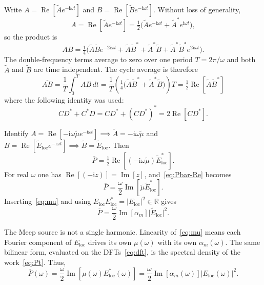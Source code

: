\documentclass[11pt,a4paper]{article}
\newcommand{\Eloc}{E_{\mathrm{loc}}}
\newcommand{\om}{\omega}
\newcommand{\alpm}{\alpha_m}
\newcommand{\re}[1]{\operatorname{Re}[#1]}
\newcommand{\im}[1]{\operatorname{Im}[#1]}
\begin{document}
\noindent
Write $A=\re{\tilde Ae^{-\mathrm{i}\om t}}$ and $B=\re{\tilde Be^{-\mathrm{i}\om t}}$.
Without loss of generality,
\begin{equation}
  A = \re{\tilde Ae^{-\mathrm{i}\om t}}
  =
  \tfrac12\bigl(\tilde Ae^{-\mathrm{i}\om t}+\tilde A^{\ast}e^{\mathrm{i}\om t}\bigr),
\end{equation}
so the product is
\begin{equation}
  AB
  =
  \tfrac14\bigl(
    \tilde A\tilde Be^{-2\mathrm{i}\om t}
    +\tilde A\tilde B^{\ast}
    +\tilde A^{\ast}\tilde B
    +\tilde A^{\ast}\tilde B^{\ast}e^{2\mathrm{i}\om t}
  \bigr).
  \label{eq:ABprod}
\end{equation}
The double-frequency terms average to zero over one period $T=2\pi/\om$ and both $\tilde A$ and $\tilde B$ are time independent.
The cycle average is therefore
\begin{equation}
  \overline{AB}
  =
  \frac{1}{T}\int_{0}^{T} AB\,dt
  =
  \frac{1}{T} \left( \tfrac14\bigl(\tilde A\tilde B^{\ast}+\tilde A^{\ast}\tilde B\bigr) \right) T
  =
  \tfrac12\re{\tilde A\tilde B^{\ast}}
  \label{eq:ABavg}
\end{equation}
where the following identity was used:
\begin{equation}
  CD^* + C^* D
  =
  CD^* + (CD^*)^* = 2 \operatorname{Re}[CD^*].
\end{equation}

\noindent
Identify $A=\re{-\mathrm{i}\om\tilde\mu e^{-\mathrm{i}\om t}} \implies \tilde A=-\mathrm{i}\om\tilde\mu$ and $B=\re{\tilde E_{\mathrm{loc}} e^{-\mathrm{i}\om t}} \implies \tilde B=\tilde E_{\mathrm{loc}}$.
Then
\begin{equation}
  \overline{P}
  =
  \tfrac12\re{(-\mathrm{i}\om\tilde\mu)\tilde E_{\mathrm{loc}}^{\ast}}.
  \label{eq:Pbar-Re}
\end{equation}
For real $\om$ one has $\re{(-\mathrm{i}z)}=\im{z}$, and~\eqref{eq:Pbar-Re} becomes
\begin{equation}
  \overline{P}
  =
  \frac{\om}{2}
  \im{\tilde\mu\tilde E_{\mathrm{loc}}^{\ast}}.
  \label{eq:Pbar}
\end{equation}
Inserting~\eqref{eq:mu} and using $\Eloc\Eloc^{\ast}=\lvert\Eloc\rvert^{2}\in\mathbb{R}$ gives
\begin{equation}
  \overline{P}
  =
  \frac{\om}{2}
  \im{\alpm}
  \lvert\tilde E_{\mathrm{loc}}\rvert^{2}.
  \label{eq:Pbar-alpha}
\end{equation}

\noindent
The Meep source is not a single harmonic.
Linearity of~\eqref{eq:mu} means each Fourier component of $\Eloc$ drives its own $\mu(\om)$ with its own $\alpm(\om)$.
The same bilinear form, evaluated on the DFTs~\eqref{eq:dft}, is the spectral density of the work~\eqref{eq:Pt}.
Thus,
\begin{equation}
  \overline{P}(\om)
  =
  \frac{\om}{2}
  \im{\mu(\om)\Eloc^{\ast}(\om)}
  =
  \frac{\om}{2}
  \im{\alpm(\om)}
  \lvert\Eloc(\om)\rvert^{2}.
  \label{eq:Pbar-w}
\end{equation}
\end{document}

